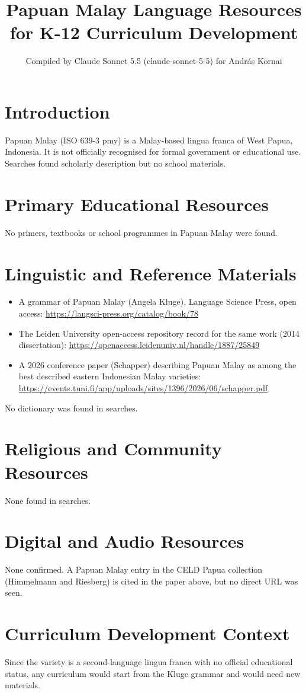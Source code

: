 \documentclass[12pt]{article}
\title{Papuan Malay Language Resources for K-12 Curriculum Development}
\author{Compiled by Claude Sonnet 5.5 (claude-sonnet-5-5) for Andr\'as Kornai}
\date{}
\begin{document}
\maketitle
\section{Introduction}
Papuan Malay (ISO 639-3 pmy) is a Malay-based lingua franca of West Papua, Indonesia. It is not officially recognised for formal government or educational use. Searches found scholarly description but no school materials.
\section{Primary Educational Resources}
No primers, textbooks or school programmes in Papuan Malay were found.
\section{Linguistic and Reference Materials}
\begin{itemize}
\item A grammar of Papuan Malay (Angela Kluge), Language Science Press, open access: \url{https://langsci-press.org/catalog/book/78}
\item The Leiden University open-access repository record for the same work (2014 dissertation): \url{https://openaccess.leidenuniv.nl/handle/1887/25849}
\item A 2026 conference paper (Schapper) describing Papuan Malay as among the best described eastern Indonesian Malay varieties: \url{https://events.tuni.fi/app/uploads/sites/1396/2026/06/schapper.pdf}
\end{itemize}
No dictionary was found in searches.
\section{Religious and Community Resources}
None found in searches.
\section{Digital and Audio Resources}
None confirmed. A Papuan Malay entry in the CELD Papua collection (Himmelmann and Riesberg) is cited in the paper above, but no direct URL was seen.
\section{Curriculum Development Context}
Since the variety is a second-language lingua franca with no official educational status, any curriculum would start from the Kluge grammar and would need new materials.
\end{document}
